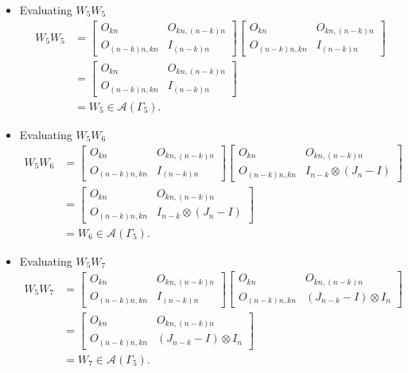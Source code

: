 \begin{itemize}
\item Evaluating $W_{5}W_{5}$
\begin{align*}
    W_5W_5
    &= \begin{bmatrix}
        O_{kn} & O_{kn, (n-k)n} \\
        O_{(n-k)n,kn} & I_{(n - k)n}
    \end{bmatrix}
    \begin{bmatrix}
        O_{kn} & O_{kn, (n-k)n} \\
        O_{(n-k)n,kn} & I_{(n - k)n}
    \end{bmatrix}\\
    &= \begin{bmatrix}
        O_{kn} & O_{kn, (n-k)n} \\
        O_{(n-k)n,kn} & I_{(n - k)n}
    \end{bmatrix}\\
    &= W_5\in\mathcal{A}(\Gamma_5).
\end{align*}

\item Evaluating $W_{5}W_{6}$
\begin{align*}
    W_5W_6
    &= \begin{bmatrix}
        O_{kn} & O_{kn, (n-k)n} \\
        O_{(n-k)n,kn} & I_{(n - k)n}
    \end{bmatrix}
    \begin{bmatrix}
        O_{kn} & O_{kn, (n-k)n} \\
        O_{(n-k)n,kn} & I_{n - k} \otimes (J_n-I)
    \end{bmatrix}\\
    &= \begin{bmatrix}
        O_{kn} & O_{kn, (n-k)n} \\
        O_{(n-k)n,kn} & I_{n - k} \otimes (J_n-I)
    \end{bmatrix}\\
    &= W_6\in\mathcal{A}(\Gamma_5).
\end{align*}

\item Evaluating $W_{5}W_{7}$
\begin{align*}
    W_5W_7
    &= \begin{bmatrix}
        O_{kn} & O_{kn, (n-k)n} \\
        O_{(n-k)n,kn} & I_{(n - k)n}
    \end{bmatrix}
    \begin{bmatrix}
        O_{kn} & O_{kn, (n-k)n} \\
        O_{(n-k)n,kn} & (J_{n - k}-I) \otimes I_n
    \end{bmatrix}\\
    &= \begin{bmatrix}
        O_{kn} & O_{kn, (n-k)n} \\
        O_{(n-k)n,kn} & (J_{n - k}-I) \otimes I_n
    \end{bmatrix}\\
    &= W_7\in\mathcal{A}(\Gamma_5).
\end{align*}


\end{itemize}
